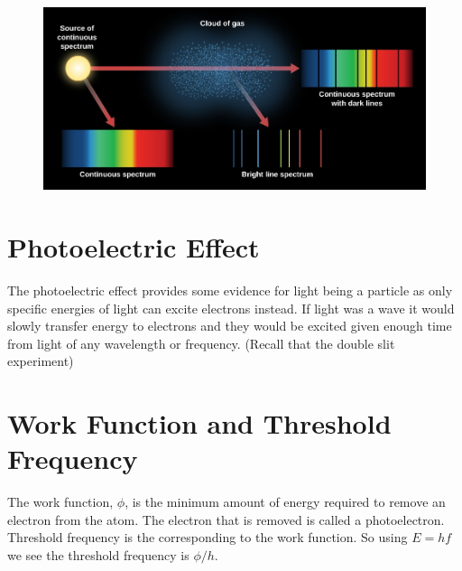 \documentclass[12pt]{article}
\begin{document}
    \begin{figure}[h]
        \includegraphics[width = \linewidth]{OSC_Astro_05_05_TSpectra.jpg}
    \end{figure}

    \section*{Photoelectric Effect}
    The photoelectric effect provides some evidence for light being a particle as only specific energies of
    light can excite electrons instead. If light was a wave it would slowly transfer energy to electrons
    and they would be excited given enough time from light of any wavelength or frequency. (Recall that the
    double slit experiment)

    \section*{Work Function and Threshold Frequency}
    The work function, $\phi$, is the minimum amount of energy required to remove an electron from the atom.
    The electron that is removed is called a photoelectron.
    Threshold frequency is the corresponding to the work function. So using $E = hf$ we see the
    threshold frequency is $\phi/h$.
\end{document}
